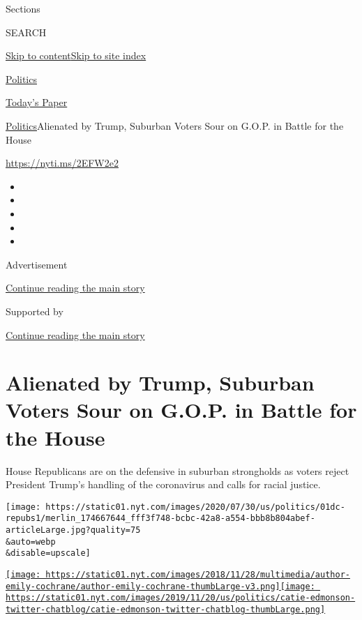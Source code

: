 Sections

SEARCH

\protect\hyperlink{site-content}{Skip to
content}\protect\hyperlink{site-index}{Skip to site index}

\href{https://www.nytimes.com/section/politics}{Politics}

\href{https://myaccount.nytimes.com/auth/login?response_type=cookie\&client_id=vi}{}

\href{https://www.nytimes.com/section/todayspaper}{Today's Paper}

\href{/section/politics}{Politics}\textbar{}Alienated by Trump, Suburban
Voters Sour on G.O.P. in Battle for the House

\url{https://nyti.ms/2EFW2e2}

\begin{itemize}
\item
\item
\item
\item
\item
\end{itemize}

Advertisement

\protect\hyperlink{after-top}{Continue reading the main story}

Supported by

\protect\hyperlink{after-sponsor}{Continue reading the main story}

\hypertarget{alienated-by-trump-suburban-voters-sour-on-gop-in-battle-for-the-house}{%
\section{Alienated by Trump, Suburban Voters Sour on G.O.P. in Battle
for the
House}\label{alienated-by-trump-suburban-voters-sour-on-gop-in-battle-for-the-house}}

House Republicans are on the defensive in suburban strongholds as voters
reject President Trump's handling of the coronavirus and calls for
racial justice.

\texttt{[image: https://static01.nyt.com/images/2020/07/30/us/politics/01dc-repubs1/merlin\_174667644\_fff3f748-bcbc-42a8-a554-bbb8b804abef-articleLarge.jpg?quality=75\\\&auto=webp\\\&disable=upscale]}

\href{https://www.nytimes.com/by/emily-cochrane}{\texttt{[image: https://static01.nyt.com/images/2018/11/28/multimedia/author-emily-cochrane/author-emily-cochrane-thumbLarge-v3.png]}}\href{https://www.nytimes.com/by/catie-edmondson}{\texttt{[image: https://static01.nyt.com/images/2019/11/20/us/politics/catie-edmonson-twitter-chatblog/catie-edmonson-twitter-chatblog-thumbLarge.png]}}

